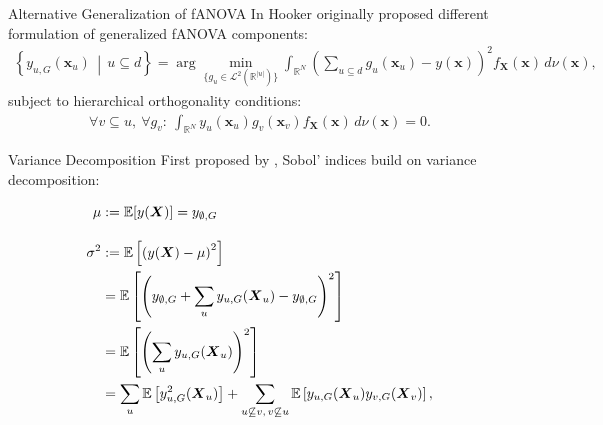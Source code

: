 \begin{frame}{Alternative Generalization of fANOVA}
  In \cite{hooker2007} Hooker originally proposed different formulation of generalized fANOVA components:
    \begin{align*}
\left\{ y_{u, G}(\boldsymbol{x}_u) \,\middle|\, u \subseteq d \right\}
= \arg\min_{\{g_u \in \mathcal{L}^2(\mathbb{R}^{|u|})\}} 
\int_{\mathbb{R}^N} \left( \sum_{u \subseteq d} g_u(\boldsymbol{x}_u) - y(\boldsymbol{x}) \right)^2 
f_{\boldsymbol{X}}(\boldsymbol{x}) \, d \nu (\boldsymbol{x}),
\label{eq:generalized_fanova_components_hooker}
\end{align*}
subject to hierarchical orthogonality conditions:
\begin{align*}
    \forall v \subseteq u,\ \forall g_v:\ 
    \int_{\mathbb{R}^N} y_u(\boldsymbol{x}_u) g_v(\boldsymbol{x}_v) 
    f_{\boldsymbol{X}}(\boldsymbol{x}) \, d \nu (\boldsymbol{x}) = 0.
\end{align*}
\end{frame}

\begin{frame}{Variance Decomposition}
  First proposed by \cite{sobol1993sensitivity}, Sobol' indices build on variance decomposition:

\begin{align*}
\mu &:= \mathbb{E}[y(\boldsymbol{X})] = y_{\emptyset,G} \\[1em]
\sigma^2 
&:= \mathbb{E}\left[ \left( y(\boldsymbol{X}) - \mu \right)^2 \right] \notag \\
&= \mathbb{E} \left[ \left( y_{\emptyset,G} + \sum_{u} y_{u,G}(\boldsymbol{X}_u) - y_{\emptyset,G} \right)^2 \right] \notag \\
&= \mathbb{E} \left[ \left( \sum_{u} y_{u,G}(\boldsymbol{X}_u) \right)^2 \right] \notag \\
&= \sum_{u} \mathbb{E} \left[ y_{u,G}^2(\boldsymbol{X}_u) \right]
+ \sum_{\substack{u \not\subseteq v,\, v \not\subseteq u}} 
\mathbb{E} \left[ y_{u,G}(\boldsymbol{X}_u) y_{v,G}(\boldsymbol{X}_v) \right],
\end{align*}
    
\end{frame}
